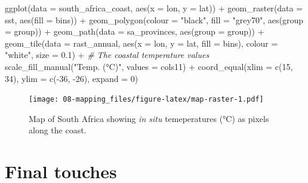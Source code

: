 \documentclass[
]{book}
\newenvironment{Shaded}{\begin{snugshade}}{\end{snugshade}}
\newcommand{\AttributeTok}[1]{\textcolor[rgb]{0.77,0.63,0.00}{#1}}
\newcommand{\CommentTok}[1]{\textcolor[rgb]{0.56,0.35,0.01}{\textit{#1}}}
\newcommand{\DecValTok}[1]{\textcolor[rgb]{0.00,0.00,0.81}{#1}}
\newcommand{\FloatTok}[1]{\textcolor[rgb]{0.00,0.00,0.81}{#1}}
\newcommand{\FunctionTok}[1]{\textcolor[rgb]{0.00,0.00,0.00}{#1}}
\newcommand{\NormalTok}[1]{#1}
\newcommand{\SpecialCharTok}[1]{\textcolor[rgb]{0.00,0.00,0.00}{#1}}
\newcommand{\StringTok}[1]{\textcolor[rgb]{0.31,0.60,0.02}{#1}}
\begin{document}
\begin{Shaded}
\begin{Highlighting}[]
\FunctionTok{ggplot}\NormalTok{(}\AttributeTok{data =}\NormalTok{ south\_africa\_coast, }\FunctionTok{aes}\NormalTok{(}\AttributeTok{x =}\NormalTok{ lon, }\AttributeTok{y =}\NormalTok{ lat)) }\SpecialCharTok{+}
  \FunctionTok{geom\_raster}\NormalTok{(}\AttributeTok{data =}\NormalTok{ sst, }\FunctionTok{aes}\NormalTok{(}\AttributeTok{fill =}\NormalTok{ bins)) }\SpecialCharTok{+}
  \FunctionTok{geom\_polygon}\NormalTok{(}\AttributeTok{colour =} \StringTok{"black"}\NormalTok{, }\AttributeTok{fill =} \StringTok{"grey70"}\NormalTok{, }\FunctionTok{aes}\NormalTok{(}\AttributeTok{group =}\NormalTok{ group)) }\SpecialCharTok{+}
  \FunctionTok{geom\_path}\NormalTok{(}\AttributeTok{data =}\NormalTok{ sa\_provinces, }\FunctionTok{aes}\NormalTok{(}\AttributeTok{group =}\NormalTok{ group)) }\SpecialCharTok{+}
  \FunctionTok{geom\_tile}\NormalTok{(}\AttributeTok{data =}\NormalTok{ rast\_annual, }\FunctionTok{aes}\NormalTok{(}\AttributeTok{x =}\NormalTok{ lon, }\AttributeTok{y =}\NormalTok{ lat, }\AttributeTok{fill =}\NormalTok{ bins), }
            \AttributeTok{colour =} \StringTok{"white"}\NormalTok{, }\AttributeTok{size =} \FloatTok{0.1}\NormalTok{) }\SpecialCharTok{+} \CommentTok{\# The coastal temperature values}
  \FunctionTok{scale\_fill\_manual}\NormalTok{(}\StringTok{"Temp. (°C)"}\NormalTok{, }\AttributeTok{values =}\NormalTok{ cols11) }\SpecialCharTok{+}
  \FunctionTok{coord\_equal}\NormalTok{(}\AttributeTok{xlim =} \FunctionTok{c}\NormalTok{(}\DecValTok{15}\NormalTok{, }\DecValTok{34}\NormalTok{), }\AttributeTok{ylim =} \FunctionTok{c}\NormalTok{(}\SpecialCharTok{{-}}\DecValTok{36}\NormalTok{, }\SpecialCharTok{{-}}\DecValTok{26}\NormalTok{), }\AttributeTok{expand =} \DecValTok{0}\NormalTok{)}
\end{Highlighting}
\end{Shaded}

\begin{figure}
\centering
\texttt{[image: 08-mapping\_files/figure-latex/map-raster-1.pdf]}
\caption{\label{fig:map-raster}Map of South Africa showing \emph{in situ} temeperatures (°C) as pixels along the coast.}
\end{figure}

\hypertarget{final-touches}{%
\section{Final touches}\label{final-touches}}
\end{document}
